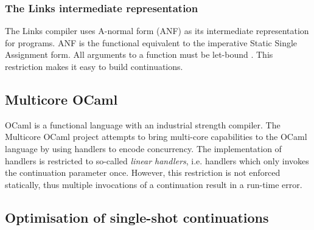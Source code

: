 \documentclass[preprint,10pt,numbers]{sigplanconf}
\begin{document}
\subsubsection{The Links intermediate representation}
The Links compiler uses A-normal form (ANF) as its intermediate representation for programs. ANF is the functional equivalent to the imperative Static Single Assignment form. All arguments to a function must be let-bound \cite{Flanagan1993}. This restriction makes it easy to build continuations.

\subsection{Multicore OCaml}
OCaml is a functional language with an industrial strength compiler. The Multicore OCaml project \cite{Dolan2015} attempts to bring multi-core capabilities to the OCaml language by using handlers to encode concurrency. The implementation of handlers is restricted to so-called \emph{linear handlers}, i.e. handlers which only invokes the continuation parameter once. However, this restriction is not enforced statically, thus multiple invocations of a continuation result in a run-time error.

  \subsection{Optimisation of single-shot continuations}

\end{document}
